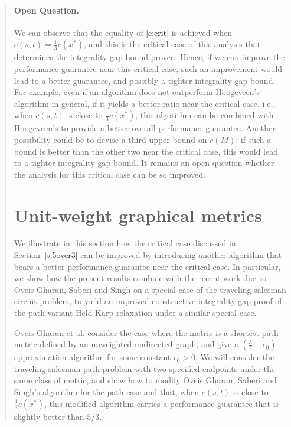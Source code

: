 \documentclass[11pt,letterpaper]{article}
\begin{document}
\begin{quote}
\paragraph{Open Question.} We can observe that the equality of \eqref{e:crit} is achieved when $c(s,t)=\frac{1}{3}c(x^*)$, and this is the critical case of this analysis that determines the integrality gap bound proven. Hence, if we can improve the performance guarantee near this critical case, such an improvement would lead to a better guarantee, and possibly a tighter integrality gap bound. For example, even if an algorithm does not outperform Hoogeveen's algorithm in general, if it yields a better ratio near the critical case, i.e., when $c(s,t)$ is close to $\frac{1}{3}c(x^*)$, this algorithm can be combined with Hoogeveen's to provide a better overall performance guarantee. Another possibility could be to devise a third upper bound on $c(M)$: if such a bound is better than the other two near the critical case, this would lead to a tighter integrality gap bound. It remains an open question whether the analysis for this critical case can be so improved.

\section{Unit-weight graphical metrics}\label{s:gm}

We illustrate in this section how the critical case discussed in Section~\ref{s:5over3} can be improved by introducing another algorithm that bears a better performance guarantee near the critical case. In particular, we show how the present results combine with the recent work due to Oveis Gharan, Saberi and Singh \cite{OSS} on a special case of the traveling salesman circuit problem, to yield an improved constructive integrality gap proof of the path-variant Held-Karp relaxation under a similar special case.

Oveis Gharan et al. consider the case where the metric is a shortest path metric defined by an unweighted undirected graph, and give a $\left(\frac{3}{2}-\epsilon_0 \right)$-approximation algorithm for some constant $\epsilon_0>0$. We will consider the traveling salesman path problem with two specified endpoints under the same class of metric, and show how to modify Oveis Gharan, Saberi and Singh's algorithm for the path case and that, when $c(s,t)$ is close to $\frac{1}{3}c(x^*)$, this modified algorithm carries a performance guarantee that is slightly better than $5/3$.


\end{quote}
\end{document}
